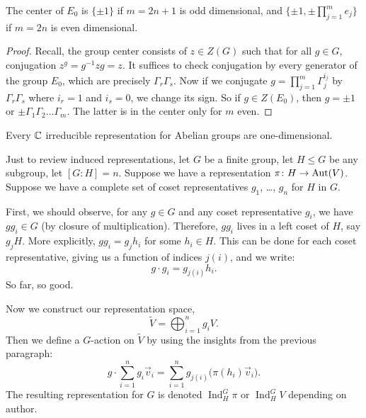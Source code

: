 \begin{lemma}\label{lemma:spin:center-of-e0}
The center of $E_{0}$ is $\{\pm1\}$ if $m=2n+1$ is odd dimensional, and
$\{\pm1,\pm\prod^{m}_{j=1}e_{j}\}$ if $m=2n$ is even dimensional.
\end{lemma}

\begin{proof}
Recall, the group center consists of $z\in Z(G)$ such that for all $g\in G$,
conjugation $z^{g}=g^{-1}zg=z$. It suffices to check conjugation by
every generator of the group $E_{0}$, which are precisely $\Gamma_{r}\Gamma_{s}$. Now if we conjugate
$g=\prod^{m}_{j=1}\Gamma_{j}^{i_{j}}$ by $\Gamma_{r}\Gamma_{s}$ where $i_{r}=1$ and $i_{s}=0$,
we change its sign. So if $g\in Z(E_{0})$, then $g=\pm1$ or $\pm \Gamma_{1}\Gamma_{2}\dots \Gamma_{m}$.
The latter is in the center only for $m$ even.
\end{proof}

\label{fact:spin:complex-irrep-abelian-group-one-dim} Every $\mathbb{C}$ irreducible representation for Abelian groups are
one-dimensional.

\label{chunk:spin:induced-rep}
Just to review induced representations, let $G$ be a finite group, let
$H\leq G$ be any subgroup, let $[G : H]=n$.
Suppose we have a representation $\pi\colon H\to\operatorname{Aut}(V)$.
Suppose we have a complete set of coset representatives $g_{1}$, \dots,
$g_{n}$ for $H$ in $G$.

First, we should observe, for any $g\in G$ and any coset representative
$g_{i}$, we have $gg_{i}\in G$ (by closure of
multiplication). Therefore, $gg_{i}$ lives in a left coset of $H$, say
$g_{j}H$. More explicitly, $gg_{i}=g_{j}h_{i}$ for some $h_{i}\in H$.
This can be done for each coset representative, giving us a function of
indices $j(i)$, and we write:
\begin{equation}
g\cdot g_{i} = g_{j(i)}h_{i}.
\end{equation}
So far, so good.

Now we construct our representation space,
\begin{equation}
\widetilde{V} = \bigoplus^{n}_{i=1}g_{i}V.
\end{equation}
Then we define a $G$-action on $\widetilde{V}$ by using the insights
from the previous paragraph:
\begin{equation}
g\cdot\sum^{n}_{i=1}g_{i}\vec{v}_{i}=\sum^{n}_{i=1}g_{j(i)}\bigl(\pi(h_{i})\vec{v}_{i}\bigr).
\end{equation}
The resulting representation for $G$ is denoted $\operatorname{Ind}_H^G\pi$
or $\operatorname{Ind}_H^GV$ depending on author.

